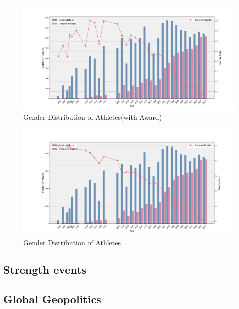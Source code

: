 \documentclass[12pt]{article}  %
\begin{document}
\begin{figure}[htbp]
	\centering
	\includegraphics[width=16cm]{img/Gender with Award.png}
	\caption{Gender Distribution of Athletes(with Award)}
	\label{fig:aa}
\end{figure}

\begin{figure}[htbp]
	\centering
	\includegraphics[width=16cm]{img/Gender.png}
	\caption{Gender Distribution of Athletes}
	\label{fig:aa}
\end{figure}

\subsection{Strength events}


\subsection{Global Geopolitics}
\end{document}
